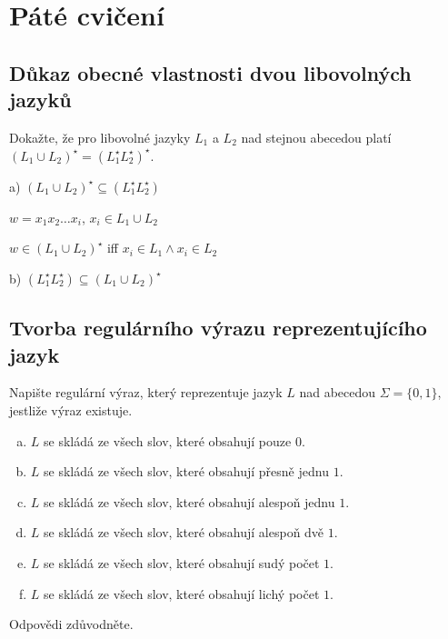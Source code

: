 \section{Páté cvičení}

\subsection{Důkaz obecné vlastnosti dvou libovolných jazyků}
Dokažte, že pro libovolné jazyky $L_1$ a $L_2$ nad stejnou abecedou platí $(L_1 \cup L_2)^\star = (L_1^\star L_2^\star)^\star$.


a) $(L_1 \cup L_2)^\star \subseteq (L_1^\star L_2^\star)$

$w = x_1 x_2 \dots x_i$, $x_i \in L_1 \cup L_2$

$w \in (L_1 \cup L_2)^\star$ iff $x_i \in L_1 \land x_i \in L_2$

b) $(L_1^\star L_2^\star) \subseteq (L_1 \cup L_2)^\star$

\subsection{Tvorba regulárního výrazu reprezentujícího jazyk}
Napište regulární výraz, který reprezentuje jazyk $L$ nad abecedou $\Sigma = \{0,1\}$, jestliže výraz existuje.
\begin{enumerate}[a), noitemsep]
    \item $L$ se skládá ze všech slov, které obsahují pouze $0$.
    \item $L$ se skládá ze všech slov, které obsahují přesně jednu $1$.
    \item $L$ se skládá ze všech slov, které obsahují alespoň jednu $1$.
    \item $L$ se skládá ze všech slov, které obsahují alespoň dvě $1$.
    \item $L$ se skládá ze všech slov, které obsahují sudý počet $1$.
    \item $L$ se skládá ze všech slov, které obsahují lichý počet $1$.
\end{enumerate}
Odpovědi zdůvodněte.

